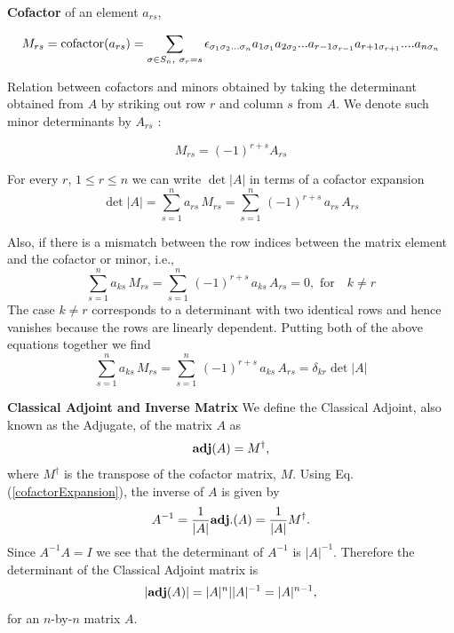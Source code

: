 {\bf Cofactor} of an element $a_{rs}$,

\begin{equation}
M _{rs}= \hbox{cofactor}(a_{rs}) = \sum_{\sigma \in S_{n},~\sigma_{r} = s } \epsilon_{ \sigma_1 \sigma_2 ... \sigma_{n}} a_{1 \sigma_1} a_{2 \sigma_2} ... a_{r-1 \sigma_{r-1}} a_{r+1 \sigma_{r+1}} ....a_{n \sigma_n} \label{detA}
\end{equation}

Relation between cofactors and minors obtained by taking the determinant obtained from $A$ by striking out row $r$ and column $s$ from $A$. We denote such minor determinants by $A_{rs}$ :

$$M_{rs} = (-1)^{r+s} A_{rs}$$

For every $r$, $1\le r \le n$ we can write $\det |A |$ in terms of a cofactor expansion
\begin{equation}
\det |A| = \sum_{s=1}^n a_{rs} \, M_{rs} = \sum_{s=1}^n\, (-1)^{r+s} \,a_{rs} \,A_{rs} \label{cofactorExpansion}
\end{equation}

Also, if there is a mismatch between the row indices between the matrix element and the cofactor or minor, i.e.,
\begin{equation}
\sum_{s=1}^n a_{ks} \, M_{rs} = \sum_{s=1}^n\, (-1)^{r+s} \,a_{ks} \,A_{rs} = 0, \mbox{ for}\quad k\ne r \label{cofactorExpansion}
\end{equation} The case $k\ne r$ corresponds to a determinant with two identical rows and hence vanishes because the rows are linearly dependent.
Putting both of the above equations together we find
\begin{equation}
\sum_{s=1}^n a_{ks} \, M_{rs} = \sum_{s=1}^n\, (-1)^{r+s} \,a_{ks} \,A_{rs} = \delta_{kr} \det |A| \label{cofactorExpansion}
\end{equation}

{\bf Classical Adjoint and Inverse Matrix}
We define the Classical Adjoint, also known as the Adjugate, of the matrix $A$ as
\[ {\bf adj}(A)= M^\dagger, \] where $M^\dagger$ is the transpose of the cofactor matrix, $M$.
Using Eq.(\ref{cofactorExpansion}), the inverse of $A$ is given by
\[ A^{-1} = {1\over|A|}{\bf adj.}(A) = {1\over|A|}M^\dagger. \label{inverseMatrix}\] Since $A^{-1} A = I$ we see that the determinant of $A^{-1}$ is $|A|^{-1}$.
Therefore the determinant of the Classical Adjoint matrix is \[ |{\bf adj}(A)| = |A|^n | |A|^{-1} = |A|^{n-1},\] for an $n$-by-$n$ matrix $A$. \\

